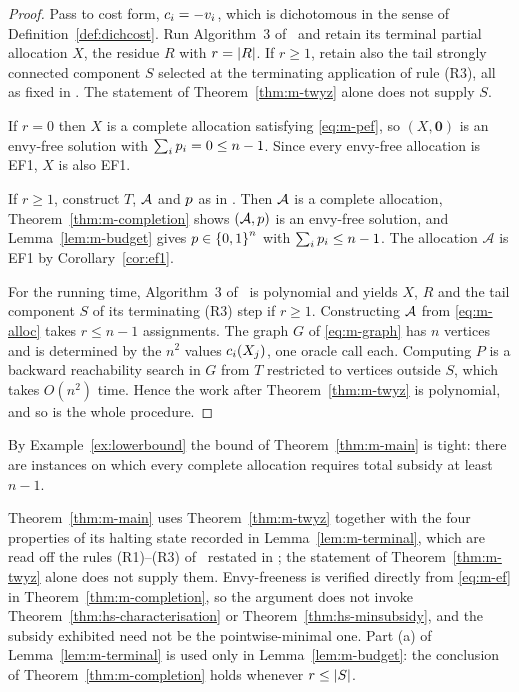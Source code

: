 \begin{proof}
Pass to cost form, $c_i = -v_i$, which is dichotomous in the sense of
Definition~\ref{def:dichcost}. Run Algorithm~3 of~\cite{TWYZ23} and retain
its terminal partial allocation $X$, the residue $R$ with $r = \left\lvert R\right\rvert$. If $r\geq 1$, retain also
the tail strongly connected component $S$ selected at the terminating
application of rule (R3), all as fixed in . The
statement of Theorem~\ref{thm:m-twyz} alone does not supply $S$.

If $r = 0$ then $X$ is a complete allocation satisfying \eqref{eq:m-pef}, so
$(X, \mathbf 0)$ is an envy-free solution with $\sum_i p_i = 0 \le n-1$. Since every envy-free allocation is EF1, $X$ is also EF1.

If $r \ge 1$, construct $T$, $\mathcal{A}$ and $p$ as in
. Then $\mathcal{A}$ is a complete allocation,
Theorem~\ref{thm:m-completion} shows $(\mathcal{A},p)$ is an envy-free
solution, and Lemma~\ref{lem:m-budget} gives $p \in \left\{0,1\right\}^n$ with
$\sum_i p_i \le n-1$. The allocation $\mathcal{A}$ is EF1 by Corollary~\ref{cor:ef1}.

For the running time, Algorithm~3 of~\cite{TWYZ23} is polynomial and yields
$X$, $R$ and the tail component $S$ of its terminating (R3) step if $r\geq 1$. Constructing $\mathcal{A}$ from \eqref{eq:m-alloc}
takes $r \le n-1$ assignments. The graph $G$ of \eqref{eq:m-graph} has $n$
vertices and is determined by the $n^2$ values $c_i(X_j)$, one oracle call
each. Computing $P$ is a backward reachability search in $G$ from $T$
restricted to vertices outside $S$, which takes $O(n^2)$ time. Hence the work
after Theorem~\ref{thm:m-twyz} is polynomial, and so is the whole procedure.
\end{proof}

By Example~\ref{ex:lowerbound} the bound of Theorem~\ref{thm:m-main} is tight:
there are instances on which every complete allocation requires total subsidy
at least $n-1$.

\begin{remark}
\label{rem:m-scope}
Theorem~\ref{thm:m-main} uses Theorem~\ref{thm:m-twyz} together with the four
properties of its halting state recorded in Lemma~\ref{lem:m-terminal}, which
are read off the rules (R1)--(R3) of~\cite{TWYZ23} restated in
; the statement of Theorem~\ref{thm:m-twyz} alone does not
supply them. Envy-freeness is verified directly from \eqref{eq:m-ef} in
Theorem~\ref{thm:m-completion}, so the argument does not invoke
Theorem~\ref{thm:hs-characterisation} or Theorem~\ref{thm:hs-minsubsidy}, and
the subsidy exhibited need not be the pointwise-minimal one. Part (a) of
Lemma~\ref{lem:m-terminal} is used only in Lemma~\ref{lem:m-budget}: the
conclusion of Theorem~\ref{thm:m-completion} holds whenever $r \le \left\lvert S\right\rvert$.
\end{remark}
